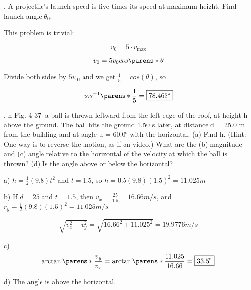 \documentclass{scrreprt} %
\begin{document}
. A projectile's launch speed is five times its speed at maximum height.
Find launch angle $\theta_0$.

This problem is trivial:

$$v_0 = 5\cdot v_{\max}$$

$$v_0 = 5v_0cos\parens*{\theta}$$

Divide both sides by $5v_0$, and we get $\frac{1}{5}=cos(\theta)$, so

$$cos^{-1}\parens*{\frac{1}{5}} = \boxed{78.463^\circ}$$






. n Fig. 4-37, a ball is thrown leftward from the left edge of the
roof, at  height  h above  the  ground. The  ball  hits  the  ground  1.50 s
later, at distance d = 25.0 m from the building and at angle u = 60.0°
with  the  horizontal. (a)  Find  h.
(Hint: One way is to reverse the
motion, as  if  on  video.)  What
are  the  (b)  magnitude  and  (c)
angle  relative  to  the  horizontal
of the velocity at which the ball
is thrown? (d) Is the angle
above or below the horizontal? \newline


a) $h=\frac{1}{2}(9.8)t^2$ and $t = 1.5$, so $h = \boxed{0.5(9.8)(1.5)^2 = 11.025 m}$

b) If $d=25$ and $t=1.5$, then $v_x = \frac{25}{1.5} = 16.66 m/s$, and $r_y = \frac{1}{2}(9.8)(1.5)^2 = 11.025 m/s$

$$\sqrt{v_x^2 + v_y^2} = \sqrt{16.66^2 + 11.025^2} = \boxed{19.9776 m/s}$$

c) $$\arctan \parens*{\frac{v_y}{v_x}} = \arctan \parens*{\frac{11.025}{16.66}} = \boxed{33.5^\circ}$$

d) The angle is above the horizontal.
\end{document}
